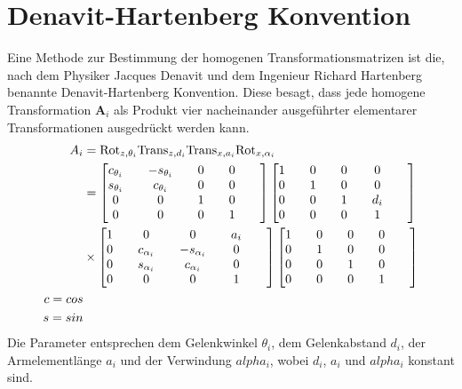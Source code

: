 \section{Denavit-Hartenberg Konvention}
Eine Methode zur Bestimmung der homogenen Transformationsmatrizen ist die, nach  dem Physiker Jacques Denavit und dem Ingenieur Richard Hartenberg benannte Denavit-Hartenberg Konvention. Diese besagt, dass jede homogene Transformation $\bm{A}_i$ als Produkt vier nacheinander ausgeführter elementarer Transformationen ausgedrückt werden kann. 
\begin{align}
	\label{eqn:elementarTransformation}
	A_i &= \text{Rot}_{z,\theta_i}\text{Trans}_{z,d_i}\text{Trans}_{x,a_i}\text{Rot}_{x,\alpha_i} \\
	&= \left[\begin{matrix}
		c_{\theta_i} &\quad -s_{\theta_i} &\quad 0 &\quad 0 \\
		s_{\theta_i} &\quad c_{\theta_i} &\quad 0 &\quad 0 \\
		0 &\quad 0 &\quad 1 &\quad 0 &\quad \\ 
		0 &\quad 0 &\quad 0 &\quad 1 &\quad 
	\end{matrix}\right] 
	\left[\begin{matrix}
		1 &\quad 0 &\quad 0 &\quad 0 \\
		0 &\quad 1 &\quad 0 &\quad 0 \\
		0 &\quad 0 &\quad 1 &\quad d_i &\quad \\ 
		0 &\quad 0 &\quad 0 &\quad 1 &\quad 
	\end{matrix}\right] \notag \\
	& \times
	\left[\begin{matrix}
		1 &\quad 0 &\quad 0 &\quad a_i \\
		0 &\quad c_{\alpha_i} &\quad -s_{\alpha_i} &\quad 0 \\
		0 &\quad s_{\alpha_i} &\quad c_{\alpha_i} &\quad 0 &\quad \\ 
		0 &\quad 0 &\quad 0 &\quad 1 &\quad 
	\end{matrix}\right]
	\left[\begin{matrix}
		1 &\quad 0 &\quad 0 &\quad 0 \\
		0 &\quad 1 &\quad 0 &\quad 0 \\
		0 &\quad 0 &\quad 1 &\quad 0 &\quad \\ 
		0 &\quad 0 &\quad 0 &\quad 1 &\quad 
	\end{matrix}\right]
	\notag \\
	c = cos\notag \\
	s = sin \notag 
\end{align}
Die Parameter entsprechen dem Gelenkwinkel $\theta_i$, dem Gelenkabstand $d_i$, der Armelementlänge $a_i$ und der Verwindung $alpha_i$, wobei $d_i$, $a_i$ und $alpha_i$ konstant sind. \cite[S.~79]{Spong.2020}
%
